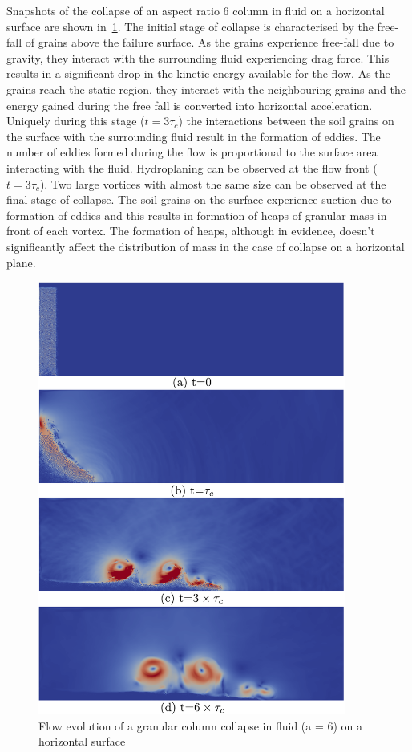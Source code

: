 Snapshots of the collapse of an aspect ratio 6 column in fluid on a horizontal 
surface are shown in~\cref{fig:LBM_DEM_a6}. The initial stage of collapse is 
characterised by the free-fall of grains above the failure surface. As the 
grains experience free-fall due to gravity, they interact with the surrounding 
fluid experiencing drag force. This results in a significant drop in the 
kinetic energy available for the flow. As the grains reach the static region, 
they interact with the neighbouring grains and the energy gained during the 
free fall is converted into horizontal acceleration. Uniquely during this stage 
($t = 3\tau_c$) the interactions between the soil grains on the surface with 
the surrounding fluid result in the formation of eddies. The number of eddies 
formed during the flow is proportional to the surface area interacting with the 
fluid. Hydroplaning can be observed at the flow front ($t = 3\tau_c$). Two 
large vortices with almost the same size can be observed at the final stage of 
collapse. The soil grains on the surface experience suction due to formation of 
eddies and this results in formation of heaps of granular mass in front of each 
vortex. The formation of heaps, although in evidence, doesn't significantly 
affect the distribution of mass in the case of collapse on a horizontal plane. 

\begin{figure}[htpb]
\centering
\includegraphics[width=0.9\textwidth]{LBM_DEM_a6}
\caption{Flow evolution of a granular column collapse in fluid (a = 6) on a 
horizontal surface}
\label{fig:LBM_DEM_a6}
\end{figure}


